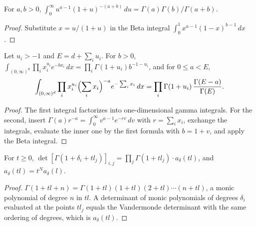 \begin{lemma}
    \label{lem:beta_half_line}
    \leanok
    For $a,b>0$,
    $\int_0^\infty u^{a-1}(1+u)^{-(a+b)}\,du=\Gamma(a)\Gamma(b)/\Gamma(a+b)$.
\end{lemma}

\begin{proof}\leanok
    Substitute $x=u/(1+u)$ in the Beta integral $\int_0^1x^{a-1}(1-x)^{b-1}\,dx$.
\end{proof}

\begin{lemma}
    \label{lem:orthant_monomials}
    \leanok
    Let $u_i>-1$ and $E=d+\sum_iu_i$. For $b>0$,
    $\int_{(0,\infty)^d}\prod_ix_i^{u_i}e^{-bx_i}\,dx=\prod_i\Gamma(1+u_i)b^{-1-u_i}$, and for
    $0\le a<E$,
    \[
        \int_{(0,\infty)^d}\prod_ix_i^{u_i}\Bigl(\sum_ix_i\Bigr)^{-a}e^{-\sum_ix_i}\,dx
        =\prod_i\Gamma(1+u_i)\,\frac{\Gamma(E-a)}{\Gamma(E)}.
    \]
\end{lemma}

\begin{proof}\leanok
    The first integral factorizes into one-dimensional gamma integrals. For the second,
    insert $\Gamma(a)r^{-a}=\int_0^\infty v^{a-1}e^{-rv}\,dv$ with $r=\sum_ix_i$, exchange the
    integrals, evaluate the inner one by the first formula with $b=1+v$, and apply the Beta
    integral.
\end{proof}

\begin{lemma}
    \label{lem:gamma_determinant}
    \leanok
    For $t\ge0$,
    $\det[\Gamma(1+\delta_i+tl_j)]_{i,j}=\prod_j\Gamma(1+tl_j)\cdot a_\delta(tl)$, and
    $a_\delta(tl)=t^Na_\delta(l)$.
\end{lemma}

\begin{proof}\leanok
    $\Gamma(1+tl+n)=\Gamma(1+tl)(1+tl)(2+tl)\cdots(n+tl)$, a monic polynomial of degree $n$ in
    $tl$. A determinant of monic polynomials of degrees $\delta_i$ evaluated at the points
    $tl_j$ equals the Vandermonde determinant with the same ordering of degrees, which is
    $a_\delta(tl)$.
\end{proof}

